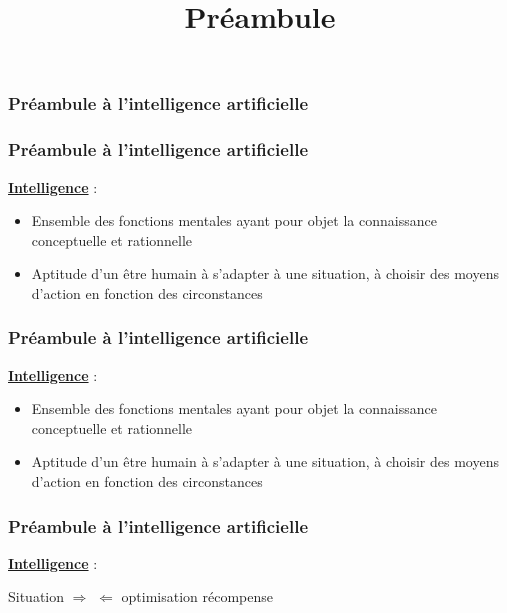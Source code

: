 \documentclass{formation}
\title{Préambule}
\begin{document}
\maketitle

\begin{frame}
  \frametitle{Préambule à l'intelligence artificielle}
  \begin{center}
    \huge{}
  \end{center}
\end{frame}

\begin{frame}
  \frametitle{Préambule à l'intelligence artificielle}
  \underline{\textbf{Intelligence}} :
  \begin{itemize}
  \item Ensemble des fonctions mentales ayant pour objet la connaissance conceptuelle et rationnelle
  \item Aptitude d'un être humain à s'adapter à une situation, à choisir des moyens d'action en fonction des circonstances
  \end{itemize}
\end{frame}

\begin{frame}
  \frametitle{Préambule à l'intelligence artificielle}
  \underline{\textbf{Intelligence}} :
  \begin{itemize}
  \item Ensemble des fonctions mentales ayant pour objet la connaissance conceptuelle et rationnelle
  \item Aptitude d'un être humain à s'adapter à une situation, à choisir des moyens d'action en fonction des circonstances
  \end{itemize}
  \begin{center}
  \end{center}
\end{frame}

\begin{frame}
  \frametitle{Préambule à l'intelligence artificielle}
  \underline{\textbf{Intelligence}} :
  \newline
  \newline
  \begin{center}
    Situation $\Rightarrow$  $\Leftarrow$ optimisation récompense
  \end{center}
\end{frame}
\end{document}
